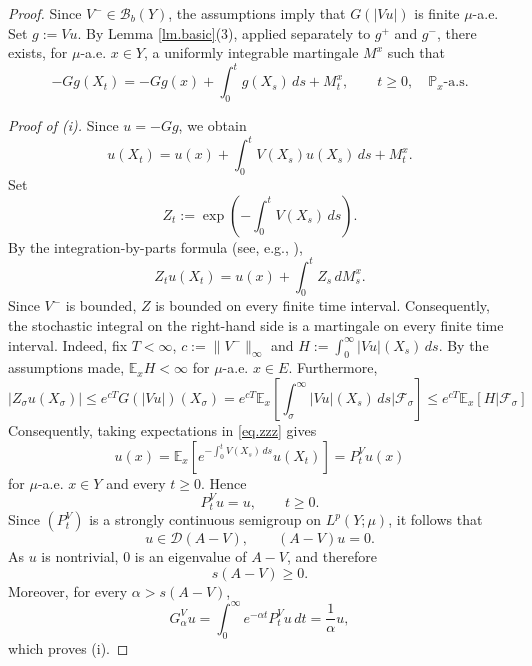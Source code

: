 \documentclass[11pt,a4paper,reqno]{amsart}
\theoremstyle{definition}
\numberwithin{equation}{section}
\begin{document}
\begin{proof}
Since $V^-\in\mathcal B_b(Y)$, the assumptions imply that
$G(|Vu|)$ is finite $\mu$-a.e. Set $g:=Vu$. By Lemma
\ref{lm.basic}(3), applied separately to $g^+$ and $g^-$, there exists,
for $\mu$-a.e. $x\in Y$, a uniformly integrable martingale $M^x$ such
that
\begin{equation*}
-Gg(X_t)=-Gg(x)+\int_0^t g(X_s)\,ds+M_t^x,\qquad t\ge0,\quad \mathbb P_x\text{-a.s.}
\end{equation*}

\smallskip
\noindent
\textit{Proof of (i).}
Since $u=-Gg$, we obtain
\begin{equation*}
u(X_t)=u(x)+\int_0^t V(X_s)u(X_s)\,ds+M_t^x.
\end{equation*}
Set
\begin{equation*}
Z_t:=\exp\left(-\int_0^tV(X_s)\,ds\right).
\end{equation*}
By the integration-by-parts formula
(see, e.g., \cite[Corollary II.6.2]{Protter}),
\begin{equation}
\label{eq.zzz}
Z_tu(X_t)=u(x)+\int_0^t Z_s\,dM_s^x.
\end{equation}
Since $V^-$ is bounded, $Z$ is bounded on every finite time interval.
Consequently, the stochastic integral on the right-hand side is a
martingale on every finite time interval. Indeed,
fix $T<\infty$, $c:=\|V^{-}\|_{\infty}$ and $H:=\int_0^{\infty}|V u|(X_s) \,ds$.
By the assumptions made, $\mathbb E_xH<\infty$ for $\mu$-a.e. $x\in E$.
Furthermore, 
\[
|Z_\sigma u(X_\sigma)| \leq e^{cT} G(|V u|)(X_\sigma)=e^{cT} \mathbb{E}_x[\int_\sigma^{\infty}
|V u|\left(X_s\right) \, d s | \mathcal{F}_\sigma]
 \leq e^{cT} \mathbb{E}_x\left[H | \mathcal{F}_\sigma\right]
\]
Consequently, taking expectations in \eqref{eq.zzz} gives
\begin{equation*}
u(x)=\mathbb E_x\left[e^{-\int_0^tV(X_s)\,ds}u(X_t)\right]=P_t^Vu(x)
\end{equation*}
for $\mu$-a.e. $x\in Y$ and every $t\ge0$. Hence
\begin{equation*}
P_t^Vu=u,\qquad t\ge0.
\end{equation*}
Since $(P_t^V)$ is a strongly continuous semigroup on $L^p(Y;\mu)$,
it follows that
\begin{equation*}
u\in\mathscr D(A-V),
\qquad
(A-V)u=0.
\end{equation*}
As $u$ is nontrivial, $0$ is an eigenvalue of $A-V$, and therefore
\begin{equation*}
s(A-V)\ge0.
\end{equation*}
Moreover, for every $\alpha>s(A-V)$,
\begin{equation*}
G_\alpha^Vu=\int_0^\infty e^{-\alpha t}P_t^Vu\,dt=\frac{1}{\alpha}u,
\end{equation*}
which proves (i).


\end{proof}
\end{document}
